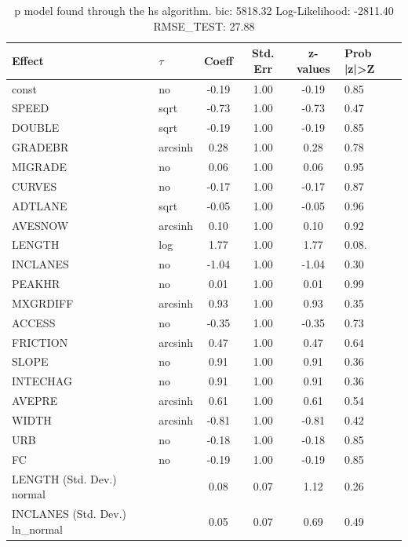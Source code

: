 \begin{table}
	\caption{p model found through the hs algorithm. bic: 5818.32 Log-Likelihood: -2811.40 RMSE_TEST: 27.88}
	\begin{center}
		\begin{tabular}{|l|l|c|c|c|l|}
			\hline
			Effect & $\tau$ & Coeff & Std. Err & z-values & Prob |z|>Z \\
			\hline
			const & no & -0.19 & 1.00 & -0.19 & 0.85 \\
			\hline
			SPEED & sqrt & -0.73 & 1.00 & -0.73 & 0.47 \\
			\hline
			DOUBLE & sqrt & -0.19 & 1.00 & -0.19 & 0.85 \\
			\hline
			GRADEBR & arcsinh & 0.28 & 1.00 & 0.28 & 0.78 \\
			\hline
			MIGRADE & no & 0.06 & 1.00 & 0.06 & 0.95 \\
			\hline
			CURVES & no & -0.17 & 1.00 & -0.17 & 0.87 \\
			\hline
			ADTLANE & sqrt & -0.05 & 1.00 & -0.05 & 0.96 \\
			\hline
			AVESNOW & arcsinh & 0.10 & 1.00 & 0.10 & 0.92 \\
			\hline
			LENGTH & log & 1.77 & 1.00 & 1.77 & 0.08. \\
			\hline
			INCLANES & no & -1.04 & 1.00 & -1.04 & 0.30 \\
			\hline
			PEAKHR & no & 0.01 & 1.00 & 0.01 & 0.99 \\
			\hline
			MXGRDIFF & arcsinh & 0.93 & 1.00 & 0.93 & 0.35 \\
			\hline
			ACCESS & no & -0.35 & 1.00 & -0.35 & 0.73 \\
			\hline
			FRICTION & arcsinh & 0.47 & 1.00 & 0.47 & 0.64 \\
			\hline
			SLOPE & no & 0.91 & 1.00 & 0.91 & 0.36 \\
			\hline
			INTECHAG & no & 0.91 & 1.00 & 0.91 & 0.36 \\
			\hline
			AVEPRE & arcsinh & 0.61 & 1.00 & 0.61 & 0.54 \\
			\hline
			WIDTH & arcsinh & -0.81 & 1.00 & -0.81 & 0.42 \\
			\hline
			URB & no & -0.18 & 1.00 & -0.18 & 0.85 \\
			\hline
			FC & no & -0.19 & 1.00 & -0.19 & 0.85 \\
			\hline
			LENGTH (Std. Dev.) normal &  & 0.08 & 0.07 & 1.12 & 0.26 \\
			\hline
			INCLANES (Std. Dev.) ln_normal &  & 0.05 & 0.07 & 0.69 & 0.49 \\

\end{tabular}
\end{center}
\end{table}
